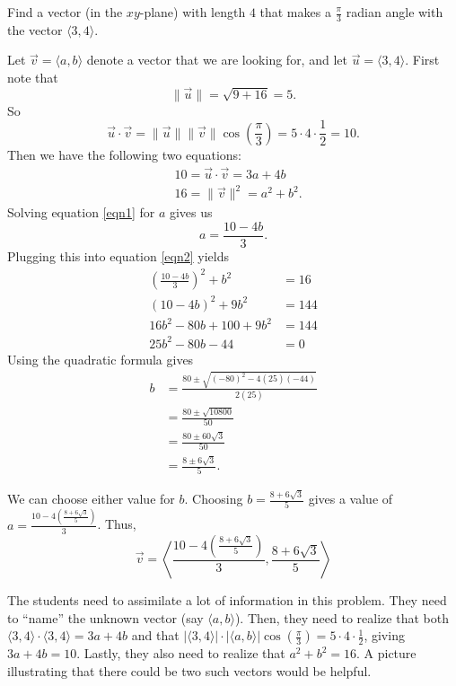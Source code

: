 \documentclass[]{ximera}
\begin{document}
\begin{problem}
Find a vector (in the $xy$-plane) with length $4$ that makes a $\frac{\pi}{3}$ radian angle with the vector $\langle 3,4 \rangle$.
	\begin{freeResponse}
	Let $\vec{v} = \langle a,b \rangle$ denote a vector that we are looking for, and let $\vec{u} = \langle 3,4 \rangle$.  
	First note that
		\[
		\| \vec{u} \| = \sqrt{9 + 16} = 5.
		\]
	So
		\[
		\vec{u} \cdot \vec{v} = \| \vec{u} \| \| \vec{v} \| \cos \left( \frac{\pi}{3} \right) = 5 \cdot 4 \cdot \frac{1}{2} = 10.
		\]
	Then we have the following two equations:
		\begin{align}
		&10 = \vec{u} \cdot \vec{v} = 3a + 4b  \label{eqn1}  \\
		&16 = \| \vec{v} \|^2 = a^2 + b^2  \label{eqn2}  .
		\end{align}
	Solving equation \eqref{eqn1} for $a$ gives us
		\[
		a = \frac{10 - 4b}{3}.
		\]
	Plugging this into equation \eqref{eqn2} yields
		\begin{align*}
		\left( \frac{10-4b}{3} \right)^2 + b^2 &= 16  \\
		(10-4b)^2 + 9b^2 &= 144  \\
		16b^2 -80b + 100 + 9b^2 &= 144  \\
		25b^2 - 80b - 44 &= 0
		\end{align*}
	Using the quadratic formula gives
		\begin{align*}
		b &= \frac{80 \pm \sqrt{(-80)^2 - 4(25)(-44)}}{2(25)}  \\
		&= \frac{80 \pm \sqrt{10800}}{50}  \\
		&= \frac{80 \pm 60\sqrt{3}}{50}  \\
		&= \frac{8 \pm 6\sqrt{3}}{5}.
		\end{align*}
		
	We can choose either value for $b$.  
	Choosing $b = \frac{8 + 6 \sqrt{3}}{5}$ gives a value of $a = \frac{10 - 4 \left( \frac{8+6\sqrt{3}}{5} \right)}{3}$.
	Thus,
		\[
		\vec{v} = \boxed{ \left\langle \frac{10 - 4 \left( \frac{8+6\sqrt{3}}{5} \right)}{3} ,  \frac{8 + 6 \sqrt{3}}{5} \right\rangle }
		\]
	\end{freeResponse}

\end{problem}

\begin{instructorNotes}
The students need to assimilate a lot of information in this problem.  
They need to ``name'' the unknown vector (say $\langle a, b \rangle$).  
Then, they need to realize that both $\langle 3,4 \rangle \cdot \langle 3,4 \rangle = 3a + 4b$ and that $\bigr| \langle 3,4 \rangle \bigr| \cdot \bigr| \langle a,b \rangle \bigr| \cos \left( \frac{\pi}{3} \right) = 5 \cdot 4 \cdot \frac{1}{2}$, giving $3a + 4b = 10$.  
Lastly, they also need to realize that $a^2 + b^2 = 16$.  
A picture illustrating that there could be two such vectors would be helpful.
\end{instructorNotes}
\end{document}
